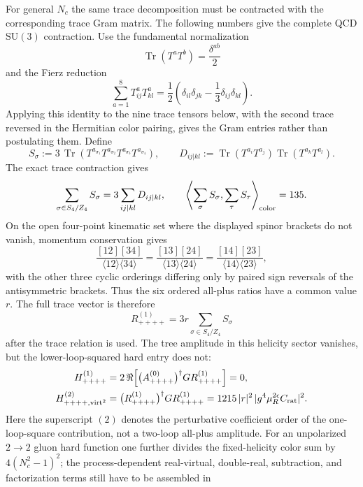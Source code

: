 \begin{controlledapproximation}
For general \(N_c\) the same trace decomposition must be contracted with the
corresponding trace Gram matrix.  The following numbers give the complete QCD
\(\mathrm{SU}(3)\) contraction.  Use the fundamental normalization
\[
  \operatorname{Tr}(T^aT^b)=\frac{\delta^{ab}}{2}
\]
and the Fierz reduction
\[
  \sum_{a=1}^{8}T^a_{ij}T^a_{kl}
  =
  \frac12\left(\delta_{il}\delta_{jk}
  -\frac13\delta_{ij}\delta_{kl}\right).
\]
Applying this identity to the nine trace tensors below, with the second trace
reversed in the Hermitian color pairing, gives the Gram entries rather than
postulating them.  Define
\[
  S_\sigma:=3\,\operatorname{Tr}(T^{a_{\sigma_1}}T^{a_{\sigma_2}}
                  T^{a_{\sigma_3}}T^{a_{\sigma_4}}),
  \qquad
  D_{ij|kl}:=\operatorname{Tr}(T^{a_i}T^{a_j})
  \operatorname{Tr}(T^{a_k}T^{a_l}) .
\]
The exact trace contraction gives
\[
  \sum_{\sigma\in S_4/Z_4}S_\sigma
  =
  3\sum_{ij|kl}D_{ij|kl},
  \qquad
  \left\langle\sum_{\sigma}S_\sigma,\sum_{\tau}S_\tau\right\rangle_{\rm color}
  =
  135 .
\]
On the open four-point kinematic set where the displayed spinor brackets do
not vanish, momentum conservation gives
\[
  \frac{[12][34]}{\langle12\rangle\langle34\rangle}
  =
  \frac{[13][24]}{\langle13\rangle\langle24\rangle}
  =
  \frac{[14][23]}{\langle14\rangle\langle23\rangle},
\]
with the other three cyclic orderings differing only by paired sign reversals
of the antisymmetric brackets.  Thus the six ordered all-plus ratios have a
common value \(r\).  The full trace vector is therefore
\[
  R_{++++}^{(1)}
  =
  3r\sum_{\sigma\in S_4/Z_4}S_\sigma
\]
after the trace relation is used.  The tree amplitude in this helicity sector
vanishes, but the lower-loop-squared hard entry does not:
\begin{align}
  H_{++++}^{(1)}
  &=
  2\,\Re\!\left[
    \bigl(A_{++++}^{(0)}\bigr)^\dagger G R_{++++}^{(1)}
  \right]
  =
  0,
  \label{eq:all-plus-four-point-hard-interference}\\
  H_{++++,\mathrm{virt}^2}^{(2)}
  &=
  \bigl(R_{++++}^{(1)}\bigr)^\dagger G R_{++++}^{(1)}
  =
  1215\,|r|^2\,|g^4\mu_R^{2\epsilon}C_{\rm rat}|^2 .
  \label{eq:all-plus-rational-first-hard-bin}
\end{align}
Here the superscript \((2)\) denotes the perturbative coefficient order of the
one-loop-square contribution, not a two-loop all-plus amplitude.  For an
unpolarized \(2\to2\) gluon hard function one further divides the fixed-helicity
color sum by \(4(N_c^2-1)^2\); the process-dependent real-virtual,
double-real, subtraction, and factorization terms still have to be assembled in

\end{controlledapproximation}
